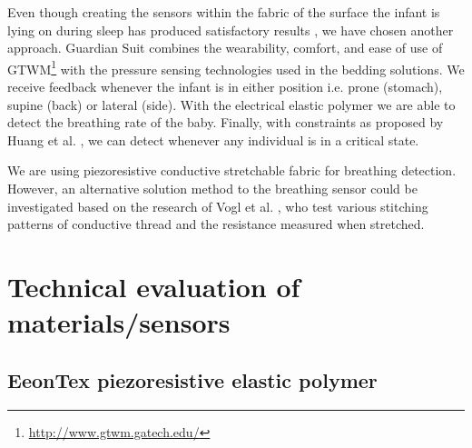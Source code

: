 \documentclass{sigchi-ext}
\begin{document}
Even though creating the sensors within the fabric of the surface the infant is lying on during sleep has produced satisfactory results \cite{a18-huang, a33-kroutil}, we have chosen another approach. Guardian Suit combines the wearability, comfort, and ease of use of GTWM\footnote{\url{http://www.gtwm.gatech.edu/}} \cite{p285-fantauzzacoffin} with the pressure sensing technologies used in the bedding solutions. We receive feedback whenever the infant is in either position i.e. prone (stomach), supine (back) or lateral (side). With the electrical elastic polymer we are able to detect the breathing rate of the baby. Finally, with constraints as proposed by Huang et al. \cite{a18-huang}, we can detect whenever any individual is in a critical state.

We are using piezoresistive conductive
stretchable fabric for breathing detection. However, an alternative solution method to the breathing sensor
could be investigated based on the research of Vogl et al. \cite{stretcheband}, who
test various stitching patterns of conductive thread and the resistance measured
when stretched.

\clearpage

\section{Technical evaluation of materials/sensors}

\subsection{EeonTex piezoresistive elastic polymer}
\end{document}
